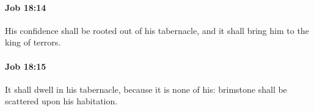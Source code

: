		\paragraph{Job 18:14} %
			\label{JOB-18-14}

			His confidence shall be rooted out of his tabernacle, and it shall bring him to the king of terrors.


		\paragraph{Job 18:15} %
			\label{JOB-18-15}

			It shall dwell in his tabernacle, because it is none of his: brimstone shall be scattered upon his habitation.


